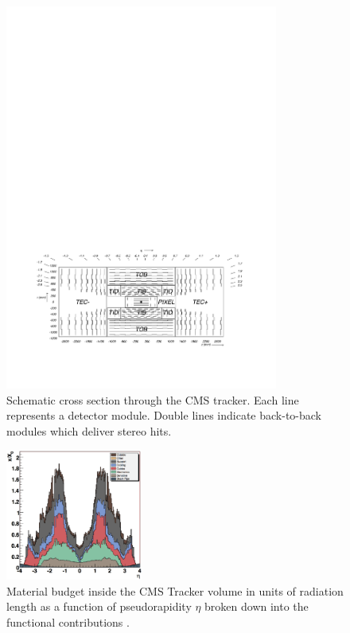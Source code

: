 \documentclass[a4paper]{jpconf}
\begin{document}
\begin{figure}[h!]
  \begin{center}
    \includegraphics[width=0.8\textwidth]{fig/general_layout.pdf}
    \caption{Schematic cross section through the CMS tracker. Each line represents a detector module. Double lines indicate back-to-back modules which deliver stereo hits.}
    \label{fig:tklayout}
  \end{center}
\end{figure}

\begin{figure}[h!]
  \begin{center}
    \includegraphics[width=0.4\textwidth]{fig/trackerMaterialbudget.png}
    \caption{Material budget inside the CMS Tracker volume in units of radiation length as a function of pseudorapidity $\eta$ broken down into the functional contributions .}
    \label{fig:tkmaterial}
  \end{center}
\end{figure}
\end{document}
